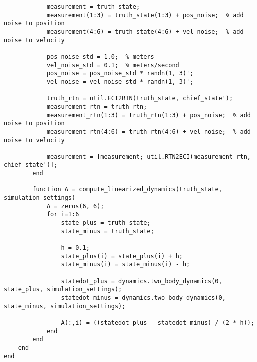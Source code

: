 \begin{lstlisting}
            measurement = truth_state;
            measurement(1:3) = truth_state(1:3) + pos_noise;  % add noise to position
            measurement(4:6) = truth_state(4:6) + vel_noise;  % add noise to velocity

            pos_noise_std = 1.0;  % meters
            vel_noise_std = 0.1;  % meters/second
            pos_noise = pos_noise_std * randn(1, 3)';
            vel_noise = vel_noise_std * randn(1, 3)';
            
            truth_rtn = util.ECI2RTN(truth_state, chief_state');
            measurement_rtn = truth_rtn;
            measurement_rtn(1:3) = truth_rtn(1:3) + pos_noise;  % add noise to position
            measurement_rtn(4:6) = truth_rtn(4:6) + vel_noise;  % add noise to velocity

            measurement = [measurement; util.RTN2ECI(measurement_rtn, chief_state')];
        end

        function A = compute_linearized_dynamics(truth_state, simulation_settings)
            A = zeros(6, 6);
            for i=1:6
                state_plus = truth_state;
                state_minus = truth_state;

                h = 0.1;
                state_plus(i) = state_plus(i) + h;
                state_minus(i) = state_minus(i) - h;

                statedot_plus = dynamics.two_body_dynamics(0, state_plus, simulation_settings);
                statedot_minus = dynamics.two_body_dynamics(0, state_minus, simulation_settings);

                A(:,i) = ((statedot_plus - statedot_minus) / (2 * h));
            end
        end
    end
end
\end{lstlisting}